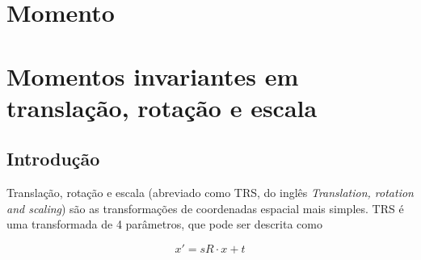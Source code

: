 \section{Momento}

\section{Momentos invariantes em translação, rotação e escala}

\subsection{Introdução}

Translação, rotação e escala (abreviado como TRS, do inglês \textit{Translation, rotation and scaling}) são as transformações de coordenadas espacial mais simples. TRS é uma transformada de 4 parâmetros, que pode ser descrita como

\[x' = sR \cdot x + t \]

